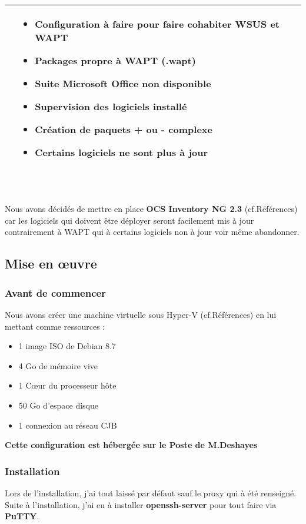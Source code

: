 \documentclass[11pt,a4paper,oneside]{article}
\begin{document}
\begin{tabular}{|p{3.1cm}|p{6.5cm}|p{6.5cm}|}
\begin{itemize}
						\end{itemize} & \begin{itemize}
												\item Configuration à faire pour faire cohabiter WSUS et WAPT 
												\item Packages propre à WAPT (.wapt)
												\item Suite Microsoft Office non disponible
												\item Supervision des logiciels installé
												\item Création de paquets + ou - complexe
												\item Certains logiciels ne sont plus à jour			
										\end{itemize} \\
	\hline	
\end{tabular}
\\ \\
Nous avons décidés de mettre en place \textbf{OCS Inventory NG 2.3} (cf.Références) car les logiciels qui doivent être déployer seront facilement mis à jour contrairement à WAPT qui à certains logiciels non à jour voir même abandonner.
\newpage
\subsection{Mise en \oe{}uvre}
\subsubsection{Avant de commencer} 
Nous avons créer une machine virtuelle sous Hyper-V (cf.Références) en lui mettant comme ressources :\\ \begin{itemize}
				\item 1 image ISO de Debian 8.7
				\item 4 Go de mémoire vive
				\item 1 C{\oe}ur du processeur hôte
				\item 50 Go d'espace disque
				\item 1 connexion au réseau CJB	
\end{itemize} 

\begin{center}
\textbf{Cette configuration est hébergée sur le Poste de M.Deshayes}
\end{center}
\subsubsection{Installation}
Lors de l'installation, j'ai tout laissé par défaut sauf le proxy qui à été renseigné. Suite à l'installation, j'ai eu à installer \textbf{openssh-server} pour tout faire via \textbf{PuTTY}.\\
\end{document}
